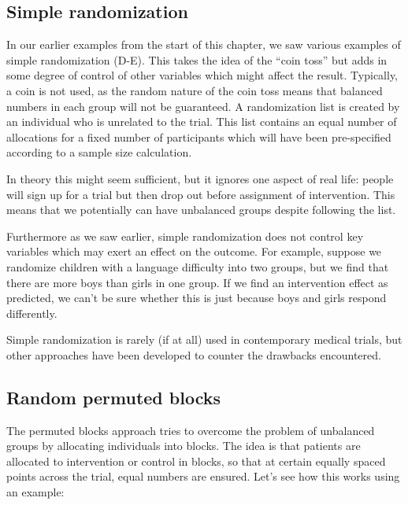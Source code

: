 \documentclass{krantz}
\begin{document}
\hypertarget{simple-randomization}{%
\subsection{Simple randomization}\label{simple-randomization}}

In our earlier examples from the start of this chapter, we saw various examples of simple randomization (D-E). This takes the idea of the ``coin toss'' but adds in some degree of control of other variables which might affect the result. Typically, a coin is not used, as the random nature of the coin toss means that balanced numbers in each group will not be guaranteed. A randomization list is created by an individual who is unrelated to the trial. This list contains an equal number of allocations for a fixed number of participants which will have been pre-specified according to a sample size calculation.

In theory this might seem sufficient, but it ignores one aspect of real life: people will sign up for a trial but then drop out before assignment of intervention. This means that we potentially can have unbalanced groups despite following the list.

Furthermore as we saw earlier, simple randomization does not control key variables which may exert an effect on the outcome. For example, suppose we randomize children with a language difficulty into two groups, but we find that there are more boys than girls in one group. If we find an intervention effect as predicted, we can't be sure whether this is just because boys and girls respond differently.

Simple randomization is rarely (if at all) used in contemporary medical trials, but other approaches have been developed to counter the drawbacks encountered.

\hypertarget{random-permuted-blocks}{%
\subsection{Random permuted blocks}\label{random-permuted-blocks}}

The permuted blocks approach tries to overcome the problem of unbalanced groups by allocating individuals into blocks. The idea is that patients are allocated to intervention or control in blocks, so that at certain equally spaced points across the trial, equal numbers are ensured. Let's see how this works using an example:
\end{document}
